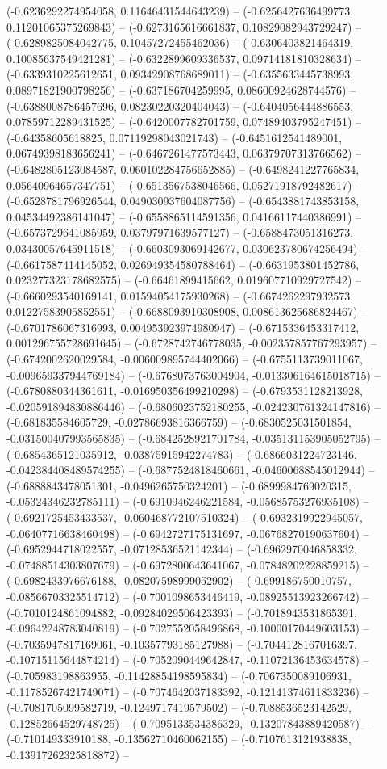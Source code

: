 	(-0.6236292274954058, 0.11646431544643239) -- (-0.6256427636499773, 0.11201065375269843) -- (-0.6273165616661837, 0.10829082943729247) -- (-0.6289825084042775, 0.10457272455462036) -- (-0.6306403821464319, 0.10085637549421281) -- (-0.6322899609336537, 0.09714181810328634) -- (-0.6339310225612651, 0.09342908768689011) -- (-0.6355633445738993, 0.08971821900798256) -- (-0.637186704259995, 0.08600924628744576) -- (-0.6388008786457696, 0.08230220320404043) -- (-0.6404056444886553, 0.07859712289431525) -- (-0.6420007782701759, 0.07489403795247451) -- (-0.64358605618825, 0.07119298043021743) -- (-0.6451612541489001, 0.06749398183656241) -- (-0.6467261477573443, 0.06379707313766562) -- (-0.6482805123084587, 0.060102284756652885) -- (-0.6498241227765834, 0.05640964657347751) -- (-0.6513567538046566, 0.05271918792482617) -- (-0.6528781796926544, 0.049030937604087756) -- (-0.6543881743853158, 0.04534492386141047) -- (-0.6558865114591356, 0.04166117440386991) -- (-0.6573729641085959, 0.03797971639577127) -- (-0.6588473051316273, 0.03430057645911518) -- (-0.6603093069142677, 0.030623780674256494) -- (-0.6617587414145052, 0.026949354580788464) -- (-0.6631953801452786, 0.023277323178682575) -- (-0.66461899415662, 0.019607710929727542) -- (-0.6660293540169141, 0.01594054175930268) -- (-0.6674262297932573, 0.01227583905852551) -- (-0.6688093910308908, 0.008613625686824467) -- (-0.6701786067316993, 0.004953923974980947) -- (-0.6715336453317412, 0.001296755728691645) -- (-0.6728742746778035, -0.002357857767293957) -- (-0.6742002620029584, -0.006009895744402066) -- (-0.6755113739011067, -0.009659337944769184) -- (-0.6768073763004904, -0.013306164615018715) -- (-0.6780880344361611, -0.016950356499210298) -- (-0.6793531128213928, -0.020591894830886446) -- (-0.6806023752180255, -0.024230761324147816) -- (-0.681835584605729, -0.02786693816366759) -- (-0.6830525031501854, -0.031500407993565835) -- (-0.6842528921701784, -0.035131153905052795) -- (-0.6854365121035912, -0.03875915942274783) -- (-0.6866031224723146, -0.042384408489574255) -- (-0.6877524818460661, -0.04600688545012944) -- (-0.6888843478051301, -0.0496265750324201) -- (-0.6899984769020315, -0.05324346232785111) -- (-0.6910946246221584, -0.05685753276935108) -- (-0.6921725453433537, -0.060468772107510324) -- (-0.6932319922945057, -0.06407716638460498) -- (-0.6942727175131697, -0.06768270190637604) -- (-0.6952944718022557, -0.07128536521142344) -- (-0.6962970046858332, -0.07488514303807679) -- (-0.6972800643641067, -0.07848202228859215) -- (-0.6982433976676188, -0.08207598999052902) -- (-0.699186750010757, -0.08566703325514712) -- (-0.7001098653446419, -0.08925513923266742) -- (-0.7010124861094882, -0.09284029506423393) -- (-0.7018943531865391, -0.09642248783040819) -- (-0.7027552058496868, -0.10000170449603153) -- (-0.7035947817169061, -0.10357793185127988) -- (-0.7044128167016397, -0.10715115644874214) -- (-0.7052090449642847, -0.11072136453634578) -- (-0.705983198863955, -0.11428854198595834) -- (-0.7067350089106931, -0.11785267421749071) -- (-0.7074642037183392, -0.12141374611833236) -- (-0.7081705099582719, -0.1249717419579502) -- (-0.7088536523142529, -0.12852664529748725) -- (-0.7095133534386329, -0.13207843889420587) -- (-0.710149333910188, -0.13562710460062155) -- (-0.7107613121938838, -0.13917262325818872) -- 